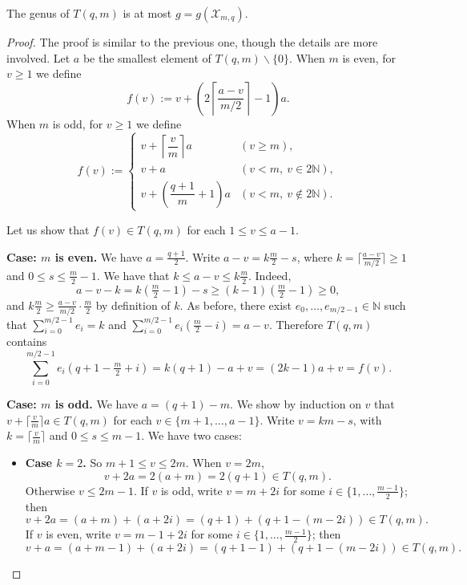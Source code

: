 \documentclass[10pt,a4paper]{amsart}
\newcommand{\coloneqq}{\mathrel{:=}}
\begin{document}
\begin{proposition}\label{genus-Pinf}
    The genus of $T(q,m)$ is at most $g = g(\mathcal{X}_{m,q})$.
\end{proposition}

\begin{proof}
    The proof is similar to the previous one, though the details are more
    involved. Let $a$ be the smallest element of $T(q,m) \smallsetminus \{0\}$.
    When $m$ is even, for $v \ge 1$ we define
    $$f(v) \coloneqq v + \left(2\left\lceil\frac{a-v}{m/2}\right\rceil - 1\right)a.$$
    When $m$ is odd, for $v \ge 1$ we define
    \[
    f(v) \coloneqq \begin{cases}
        v + \left\lceil\dfrac{v}{m}\right\rceil a
            & \left(v \ge m\right), \\[6pt]
        v + a
            & \left(v < m,\ v \in 2\mathbb{N}\right), \\[6pt]
        v + \left(\dfrac{q+1}{m}+1\right)a
            & \left(v < m,\ v \notin 2\mathbb{N}\right).
    \end{cases}
    \]

    Let us show that $f(v) \in T(q,m)$ for each $1 \le v \le a-1$.

    \medskip
    \noindent\textbf{Case: $m$ is even.}
    We have $a = \frac{q+1}{2}$. Write $a - v = k\frac{m}{2} - s$, where
    $k = \lceil\frac{a-v}{m/2}\rceil \ge 1$ and $0 \le s \le \frac{m}{2}-1$.
    We have that $k \le a-v \le k\frac{m}{2}$. Indeed,
    $$a - v - k = k\left(\tfrac{m}{2}-1\right) - s \ge (k-1)\left(\tfrac{m}{2}-1\right) \ge 0,$$
    and $k\frac{m}{2} \ge \frac{a-v}{m/2}\cdot\frac{m}{2}$ by definition of $k$.
    As before, there exist $e_0, \ldots, e_{m/2-1} \in \mathbb{N}$ such that
    $\sum_{i=0}^{m/2-1} e_i = k$ and
    $\sum_{i=0}^{m/2-1} e_i\!\left(\frac{m}{2}-i\right) = a-v$.
    Therefore $T(q,m)$ contains
    $$\sum_{i=0}^{m/2-1} e_i\!\left(q+1-\tfrac{m}{2}+i\right)
      = k(q+1) - a + v = (2k-1)a + v = f(v).$$

    \medskip
    \noindent\textbf{Case: $m$ is odd.}
    We have $a = (q+1)-m$. We show by induction on $v$ that
    $v + \lceil\frac{v}{m}\rceil a \in T(q,m)$ for each
    $v \in \{m+1, \ldots, a-1\}$.
    Write $v = km - s$, with $k = \lceil\frac{v}{m}\rceil$ and $0 \le s \le m-1$.
    We have two cases:

    \begin{itemize}
        \item \textbf{Case $k = 2$.} So $m+1 \le v \le 2m$.
        When $v = 2m$,
        $$v + 2a = 2(a+m) = 2(q+1) \in T(q,m).$$
        Otherwise $v \le 2m-1$.
        If $v$ is odd, write $v = m + 2i$ for some
        $i \in \{1,\ldots,\frac{m-1}{2}\}$; then
        $$v + 2a = (a+m) + (a+2i) = (q+1) + (q+1-(m-2i)) \in T(q,m).$$
        If $v$ is even, write $v = m-1+2i$ for some
        $i \in \{1,\ldots,\frac{m-1}{2}\}$; then
        $$v + a = (a+m-1) + (a+2i) = (q+1-1) + (q+1-(m-2i)) \in T(q,m).$$


\end{itemize}
\end{proof}
\end{document}
